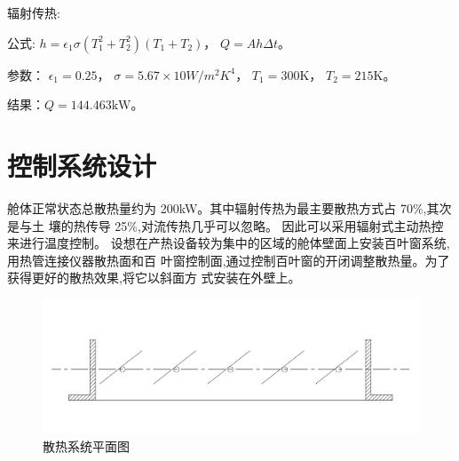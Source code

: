 辐射传热:

公式: $h = \epsilon_1 \sigma(T^2_1 + T^2_2)( T_1 + T_2 )$，
$Q=Ah\Delta t$。

参数：
$\epsilon_1 = 0.25$，
$\sigma = 5.67 \times  10\si{W/{m^2K^4}}$，
$T_1 = 300\si{\kelvin}$，
$T_2 = 215\si{\kelvin}$。

结果：$Q=144.463\si{\kilo\watt}$。

\section{控制系统设计}

舱体正常状态总散热量约为 200\si{\kilo\watt}。其中辐射传热为最主要散热方式占 70\%,其次是与土
壤的热传导 25\%,对流传热几乎可以忽略。
因此可以采用辐射式主动热控来进行温度控制。
设想在产热设备较为集中的区域的舱体壁面上安装百叶窗系统,用热管连接仪器散热面和百
叶窗控制面,通过控制百叶窗的开闭调整散热量。为了获得更好的散热效果,将它以斜面方
式安装在外壁上。

\begin{figure}[H]
  \centering
  \includegraphics[width=\textwidth]{figure/envctrl.png}
  \caption{散热系统平面图}
  \label{chp:envctrl:end}
\end{figure}
